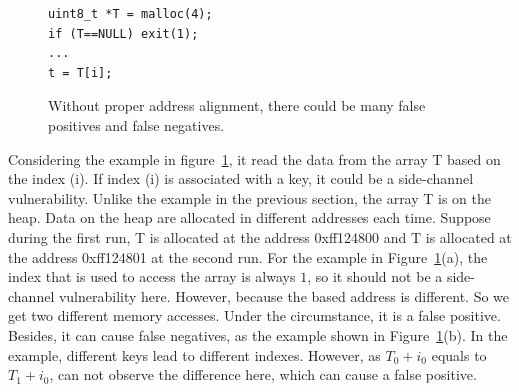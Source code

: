 \begin{figure}[h]
  \begin{minipage}{0.45\linewidth}
    \begin{lstlisting}[numbers=none,xleftmargin=.1\textwidth,xrightmargin=.2\textwidth]
uint8_t *T = malloc(4);
if (T==NULL) exit(1);
...
t = T[i];    
\end{lstlisting}
  \end{minipage}
  \hfill
  \begin{minipage}{0.5\linewidth}
  \end{minipage}
  \caption{Without proper address alignment, there could be many false positives and false negatives.}\label{fig:align}
\end{figure}

Considering the example in figure~\ref{fig:align}, it read the data from the array \textsf{T} based on the index (i). If index (i) is associated with a key, it could be a side-channel vulnerability. Unlike the example in the previous section, the array \textsf{T} is on the heap. Data on the heap are allocated in different addresses each time. Suppose during the first run, \textsf{T} is allocated at the address \textsf{0xff124800} and \textsf{T} is allocated at the address \textsf{0xff124801} at the second run. For the example in Figure~\ref{fig:align}(a), the index that is used to access the array is always $1$, so it should not be a side-channel vulnerability here. However, because the based address is different. So we get two different memory accesses. Under the circumstance, it is a false positive. Besides, it can cause false negatives, as the example shown in Figure~\ref{fig:align}(b). In the example, different keys lead to different indexes. However, as $T_0 + i_0$ equals to $T_1 + i_0$, \ctool{} can not observe the difference here, which can cause a false positive.

